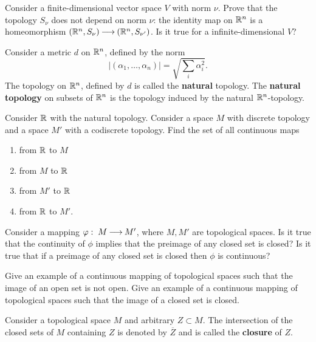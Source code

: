 \documentclass[12pt]{article}
\begin{document}
\begin{zadacha}[**]
  Consider a finite-dimensional vector space $V$ with norm $\nu$.
  Prove that the topology $S_\nu$ does not depend on norm $\nu$: the
  identity map on ${\mathbb R}^n$ is a homeomorphism $({\mathbb R}^n, S_\nu){\:\longrightarrow\:}
  ({\mathbb R}^n, S_{\nu'})$. Is it true for a infinite-dimensional $V$?
\end{zadacha}

\begin{opredelenie}
Consider a metric $d$ on ${\mathbb R}^n$, defined by the norm
\[ 
|(\alpha_1, \dots, \alpha_n)|= \sqrt{\sum_i \alpha_i^2}.
\]
The topology on ${\mathbb R}^n$, defined by $d$ is called the {\bf natural}
topology. The {\bf natural topology} on subsets of ${\mathbb R}^n$ is 
the topology induced by the natural ${\mathbb R}^n$-topology.
\end{opredelenie}

\begin{zadacha} 
Consider ${\mathbb R}$ with the natural topology.  Consider a space $M$ with
discrete topology and a space $M'$ with a codiscrete topology. Find the
set of all continuous maps 
\begin{enumerate}
\item from ${\mathbb R}$ to $M$

\item from $M$ to ${\mathbb R}$

\item from $M'$ to ${\mathbb R}$

\item from ${\mathbb R}$ to $M'$.
\end{enumerate}
\end{zadacha}

\begin{zadacha} 
Consider a mapping $\varphi:\; M {\:\longrightarrow\:} M'$, where $M,M'$ are topological
spaces. Is it true that the continuity of $\phi$ implies that the preimage 
of any closed set is closed? Is it true that if a preimage of any
closed set is closed then $\phi$  is continuous?
\end{zadacha}

\begin{zadacha}
Give an example of a continuous mapping of topological spaces such
that the image of an open set is not open. Give an example of a
continuous mapping of topological spaces such that the image of a
closed set is closed.
\end{zadacha}

\begin{opredelenie}
  Consider a topological space $M$ and arbitrary $Z\subset
  M$.  The intersection of the closed sets of $M$ containing $Z$
   is denoted by $\overline{Z}$ and is called the {\bf closure}
  of $Z$.
\end{opredelenie}
\end{document}

